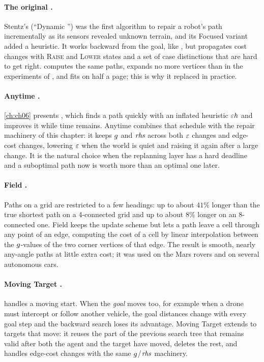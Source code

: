 \paragraph{The original \dstar.}
Stentz's \dstar (``Dynamic \astar'') \cite{stentz1994optimal} was the first algorithm
to repair a robot's path incrementally as its sensors revealed unknown terrain, and
its Focused variant \cite{stentz1995focussed} added a heuristic. It works backward from the goal, like
\dstarlite, but propagates cost changes with \textsc{Raise} and \textsc{Lower} states
and a set of case distinctions that are hard to get right. \dstarlite computes the same
paths, expands no more vertices than \dstar in the experiments of
\textcite{koenig2005fast}, and fits on half a page; this is
why it replaced \dstar in practice.

\paragraph{Anytime \dstar.}
\cref{ch:ch06} presents \arastar, which finds a path quickly with an inflated heuristic
$\varepsilon h$ and improves it while time remains. Anytime \dstar
\cite{likhachev2005anytime} combines that schedule with the repair machinery of this
chapter: it keeps $g$ and $\mathit{rhs}$ across both $\varepsilon$ changes and edge-cost changes,
lowering $\varepsilon$ when the world is quiet and raising it again after a large change. It is
the natural choice when the replanning layer has a hard deadline and a suboptimal path
now is worth more than an optimal one later.

\paragraph{Field \dstar.}
Paths on a grid are restricted to a few headings: up to about $41\%$ longer than the
true shortest path on a 4-connected grid and up to about $8\%$ longer on an 8-connected
one. Field \dstar \cite{ferguson2006field}
keeps the \dstarlite update scheme but lets a path leave a cell through any point of
an edge, computing the cost of a cell by linear interpolation between the
$g$-values of the two corner vertices of that edge. The result is smooth, nearly
any-angle paths at little extra cost; it was used on the Mars rovers and on several
autonomous cars.

\paragraph{Moving Target \dstarlite.}
\dstarlite handles a moving start. When the \emph{goal} moves too, for example when a
drone must intercept or follow another vehicle, the goal distances change with every
goal step and the backward search loses its advantage. Moving Target \dstarlite
\cite{sun2010moving} extends \dstarlite to targets that move: it reuses the part of the
previous search tree that remains valid after both the agent and the target have moved,
deletes the rest, and handles edge-cost changes with the same $g$/$\mathit{rhs}$
machinery.

